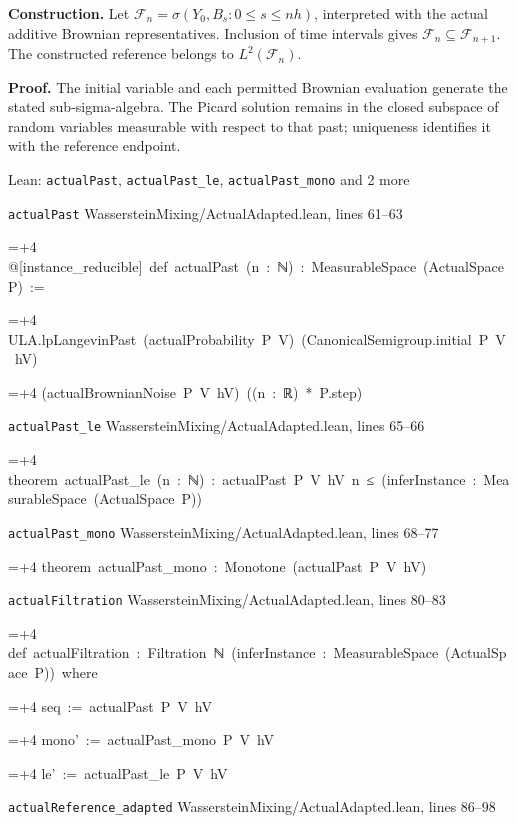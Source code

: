 \documentclass[11pt,a4paper]{article}
\newlength{\leancharwidth}
\newenvironment{leancode}{\par\smallskip\begingroup\ttfamily\footnotesize\raggedright
  \settowidth{\leancharwidth}{M}\setlength{\parskip}{0pt}\setlength{\parindent}{0pt}
  \frenchspacing}{\par\endgroup\smallskip}
\newcommand{\leanline}[2]{\hangindent=\dimexpr#1\leancharwidth+4\leancharwidth\relax
  \hangafter=1\noindent\hspace*{#1\leancharwidth}#2\par}
\newcommand{\leansource}[1]{\par{\footnotesize\color{leanmuted}#1}\par}
\begin{document}
\textbf{Construction.} Let \(\mathcal F_n=\sigma(Y_0,B_s:0\le s\le nh)\), interpreted with the actual additive Brownian representatives. Inclusion of time intervals gives \(\mathcal F_n\subseteq\mathcal F_{n+1}\). The constructed reference belongs to \(L^2(\mathcal F_n)\).



\textbf{Proof.} The initial variable and each permitted Brownian evaluation generate the stated sub-sigma-algebra. The Picard solution remains in the closed subspace of random variables measurable with respect to that past; uniqueness identifies it with the reference endpoint.

\begin{leanbox}{Lean: \texttt{actualPast}, \texttt{actualPast\_\allowbreak{}le}, \texttt{actualPast\_\allowbreak{}mono} and 2 more}
\leansource{\texttt{actualPast} \quad WassersteinMixing/\allowbreak{}ActualAdapted.lean, lines 61–63}
\begin{leancode}
\leanline{0}{@[instance\_reducible]\ def\ actualPast\ (n\ :\ ℕ)\ :\ MeasurableSpace\ (ActualSpace\ P)\ :=}
\leanline{2}{ULA.lpLangevinPast\ (actualProbability\ P\ V)\ (CanonicalSemigroup.initial\ P\ V\ hV)}
\leanline{4}{(actualBrownianNoise\ P\ V\ hV)\ ((n\ :\ ℝ)\ *\ P.step)}
\end{leancode}
\leansource{\texttt{actualPast\_\allowbreak{}le} \quad WassersteinMixing/\allowbreak{}ActualAdapted.lean, lines 65–66}
\begin{leancode}
\leanline{0}{theorem\ actualPast\_le\ (n\ :\ ℕ)\ :\ actualPast\ P\ V\ hV\ n\ ≤\ (inferInstance\ :\ MeasurableSpace\ (ActualSpace\ P))}
\end{leancode}
\leansource{\texttt{actualPast\_\allowbreak{}mono} \quad WassersteinMixing/\allowbreak{}ActualAdapted.lean, lines 68–77}
\begin{leancode}
\leanline{0}{theorem\ actualPast\_mono\ :\ Monotone\ (actualPast\ P\ V\ hV)}
\end{leancode}
\leansource{\texttt{actualFiltration} \quad WassersteinMixing/\allowbreak{}ActualAdapted.lean, lines 80–83}
\begin{leancode}
\leanline{0}{def\ actualFiltration\ :\ Filtration\ ℕ\ (inferInstance\ :\ MeasurableSpace\ (ActualSpace\ P))\ where}
\leanline{2}{seq\ :=\ actualPast\ P\ V\ hV}
\leanline{2}{mono'\ :=\ actualPast\_mono\ P\ V\ hV}
\leanline{2}{le'\ :=\ actualPast\_le\ P\ V\ hV}
\end{leancode}
\leansource{\texttt{actualReference\_\allowbreak{}adapted} \quad WassersteinMixing/\allowbreak{}ActualAdapted.lean, lines 86–98}

\end{leanbox}
\end{document}
